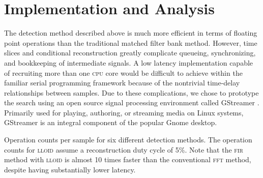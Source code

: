 \section{Implementation and Analysis}
\label{SECIII}\label{sec:analysis}

 The detection method described above is much more efficient in terms of floating point operations than the traditional matched filter bank method.  However, time slices and conditional reconstruction greatly complicate queueing, synchronizing, and bookkeeping of intermediate signals.  A low latency implementation capable of recruiting more than one \textsc{cpu} core would be difficult to achieve within the familiar serial programming framework because of the nontrivial time-delay relationships between samples.  Due to these complications, we chose to prototype the search using an open source signal processing environment called GStreamer \cite{gstreamer}.  Primarily used for playing, authoring, or streaming media on Linux systems, GStreamer is an integral component of the popular Gnome desktop.


\begin{table}[!h]
\caption{Operation counts per sample for six different detection methods.  The operation counts for \textsc{lloid} assume a reconstruction duty cycle of 5\%.  Note that the \textsc{fir} method with \textsc{lloid} is almost 10 times faster than the conventional \textsc{fft} method, despite having substantially lower latency.}
\begin{center}

\end{center}
\end{table}

